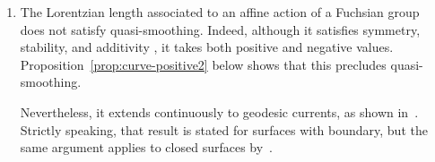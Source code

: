 \documentclass[11pt]{amsart}
\newcommand{\ora}[1]{\overrightarrow{#1}}
\numberwithin{equation}{section}
\numberwithin{figure}{section}
\theoremstyle{definition}
\theoremstyle{plain}
\begin{document}
\begin{enumerate}
\begin{proof}
$\ell$ does not satisfy quasi-smoothing, find crossing
$\ora{a}$ and $\ora{b}$ as above. If quasi-smoothing were satisfied, by
Proposition~\ref{prop:join-split-geom},
Equation~\eqref{eq:cross-cancel}, there would exist a constants $R>0$
and $s'>0$ so that for all $n \geq s'$, we would have
\[
\ell(ba^n ba^{-n}) \geq \ell(a^{2n})-R.
\]
But this inequality is violated, since on the one hand, the left hand side is $0$, and, on the other hand, the right hand side is positive for large enough $n$.
\end{proof}
\item The Lorentzian length associated to an affine action of a Fuchsian
group~\cite{GM00:FlatLorentzian} does not satisfy quasi-smoothing.
Indeed, although it satisfies symmetry, stability, and additivity
\cite[p.~1053]{GML09:ProperAffine}, it takes both positive and negative
values. Proposition~\ref{prop:curve-positive2} below shows that this
precludes quasi-smoothing.

Nevertheless, it extends continuously to geodesic currents, as shown
in~\cite[Section~6.1]{GML09:ProperAffine}. Strictly speaking, that
result is stated for surfaces with boundary, but the same argument
applies to closed surfaces by~\cite{Lab01:Diffusion}.
\end{enumerate}
\end{document}
